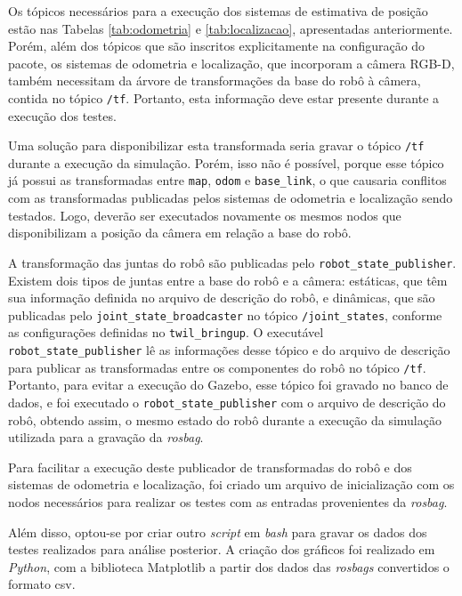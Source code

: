 \documentclass[repeatfields,xlists,xpacks,oneside,yearsonly]{ufrgscca}
\begin{document}
Os tópicos necessários para a execução dos sistemas de estimativa de
posição estão nas Tabelas \ref{tab:odometria} e
\ref{tab:localizacao}, apresentadas anteriormente. Porém, além dos
tópicos que são inscritos explicitamente na configuração do pacote,
os sistemas de odometria e localização, que incorporam a câmera
RGB-D, também necessitam da árvore de transformações da base do robô
à câmera, contida no tópico \texttt{/tf}. Portanto, esta informação
deve estar presente durante a execução dos testes.

Uma solução para disponibilizar esta transformada seria gravar o
tópico \texttt{/tf} durante a execução da simulação. Porém, isso não
é possível, porque esse tópico já possui as transformadas entre
\texttt{map}, \texttt{odom} e \texttt{base\_link}, o que causaria
conflitos com as transformadas publicadas pelos sistemas de odometria
e localização sendo testados. Logo, deverão ser executados novamente
os mesmos nodos que disponibilizam a posição da câmera em relação a
base do robô.

A transformação das juntas do robô são publicadas pelo
\texttt{robot\_state\_publisher}. Existem dois tipos de juntas entre
a base do robô e a câmera: estáticas, que têm sua informação definida
no arquivo de descrição do robô, e dinâmicas, que são publicadas pelo
\texttt{joint\_state\_broadcaster} no tópico \texttt{/joint\_states},
conforme as configurações definidas no \texttt{twil\_bringup}. O
executável \texttt{robot\_state\_publisher} lê as informações desse
tópico e do arquivo de descrição para publicar as transformadas entre
os componentes do robô no tópico \texttt{/tf}. Portanto, para evitar
a execução do Gazebo, esse tópico foi gravado no banco de dados, e
foi executado o \texttt{robot\_state\_publisher} com o arquivo de
descrição do robô, obtendo assim, o mesmo estado do robô durante a
execução da simulação utilizada para a gravação da \textit{rosbag}.

Para facilitar a execução deste publicador de transformadas do robô e
dos sistemas de odometria e localização, foi criado um arquivo de
inicialização com os nodos necessários para realizar os testes com as
entradas provenientes da \textit{rosbag}.

Além disso, optou-se por criar outro \textit{script} em \textit{bash}
para gravar os dados dos testes realizados para análise posterior. A
criação dos gráficos foi realizado em \textit{Python}, com a
biblioteca Matplotlib a partir dos dados das \textit{rosbags}
convertidos o formato csv.
\end{document}

